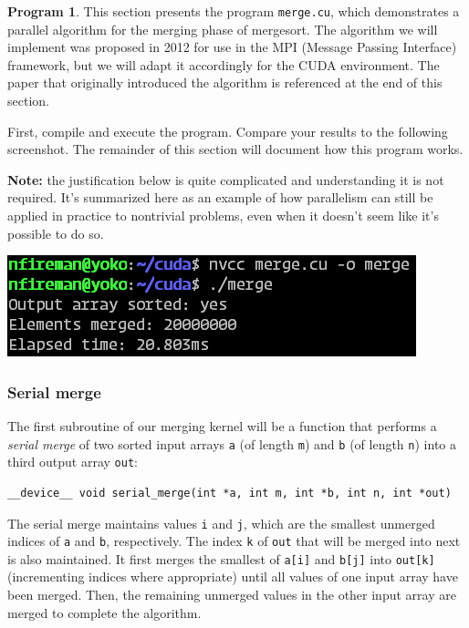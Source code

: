 \documentclass{article}
\theoremstyle{definition}
\newtheorem{program}{Program}
\begin{document}
\begin{program}

This section presents the program \texttt{merge.cu}, which demonstrates a parallel algorithm for the merging phase of mergesort. The algorithm we will implement was proposed in 2012 for use in the MPI (Message Passing Interface) framework, but we will adapt it accordingly for the CUDA environment. The paper that originally introduced the algorithm is referenced at the end of this section.

First, compile and execute the program. Compare your results to the following screenshot. The remainder of this section will document how this program works.

\textbf{Note:} the justification below is quite complicated and understanding it is not required. It's summarized here as an example of how parallelism can still be applied in practice to nontrivial problems, even when it doesn't seem like it's possible to do so.

\includegraphics[width=\textwidth]{images/merge-output.png}

\end{program}

\subsubsection{Serial merge}

The first subroutine of our merging kernel will be a function that performs a \emph{serial merge} of two sorted input arrays \texttt{a} (of length \texttt{m}) and \texttt{b} (of length \texttt{n}) into a third output array \texttt{out}:

\begin{verbatim}
__device__ void serial_merge(int *a, int m, int *b, int n, int *out)
\end{verbatim}

The serial merge maintains values \texttt{i} and \texttt{j}, which are the smallest unmerged indices of \texttt{a} and \texttt{b}, respectively. The index \texttt{k} of \texttt{out} that will be merged into next is also maintained. It first merges the smallest of \texttt{a[i]} and \texttt{b[j]} into \texttt{out[k]} (incrementing indices where appropriate) until all values of one input array have been merged. Then, the remaining unmerged values in the other input array are merged to complete the algorithm.
\end{document}
